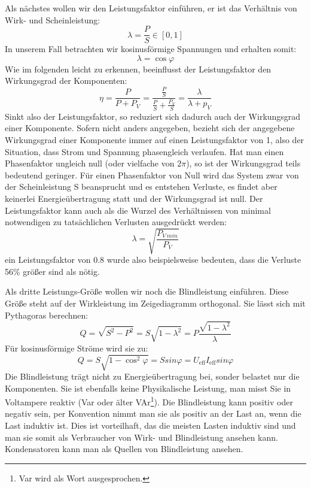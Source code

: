 Als nächstes wollen wir den Leistungsfaktor einführen, er ist das Verhältnis von Wirk- und Scheinleistung:
\begin{equation}
\lambda = \frac{P}{S} \in [0,1]
\end{equation}
In unserem Fall betrachten wir kosinusförmige Spannungen und erhalten somit:
\begin{equation}
\lambda = \cos \varphi
\end{equation}
Wie im folgenden leicht zu erkennen, beeinflusst der Leistungsfaktor den Wirkungsgrad der Komponenten:
\begin{equation}
\eta = \frac{P}{P+P_V} = \frac{\frac{P}{S}}{\frac{P}{S}+\frac{P_V}{S}} = \frac{\lambda}{\lambda + p_V}
\end{equation}
Sinkt also der Leistungsfaktor, so reduziert sich dadurch auch der Wirkungsgrad einer Komponente. Sofern nicht anders angegeben, bezieht sich der angegebene Wirkungsgrad einer Komponente immer auf einen Leistungsfaktor von 1, also der Situation, dass Strom und Spannung phasengleich verlaufen. Hat man einen Phasenfaktor ungleich null (oder vielfache von $2\pi$), so ist der Wirkungsgrad teils bedeutend geringer. Für einen Phasenfaktor von Null wird das System zwar von der Scheinleistung S beansprucht und es entstehen Verluste, es findet aber keinerlei Energieübertragung statt und der Wirkungsgrad ist null.
Der Leistungsfaktor kann auch als die Wurzel des Verhältnissen von minimal notwendigen zu tatsächlichen Verlusten ausgedrückt werden:
\begin{equation}
\lambda = \sqrt{\frac{P_{V\:min}}{P_V}}	%
\end{equation}
ein Leistungsfaktor von 0.8 wurde also beispielsweise bedeuten, dass die Verluste 56\% größer sind als nötig.

Als dritte Leistungs-Größe wollen wir noch die Blindleistung einführen. Diese Größe steht auf der Wirkleistung im Zeigediagramm orthogonal. %
Sie lässt sich mit Pythagoras berechnen:
\begin{equation}
Q = \sqrt{S^2-P^2} = S \sqrt{1-\lambda^2} = P \frac{\sqrt{1-\lambda^2}}{\lambda}
\end{equation}
Für kosinusförmige Ströme wird sie zu:
\begin{equation}
Q = S \sqrt{1-\cos^2 \varphi} = S sin \varphi = U_{\mathrm{eff}} I_{\mathrm{eff}} sin \varphi
\end{equation}
Die Blindleistung trägt nicht zu Energieübertragung bei, sonder belastet nur die Komponenten. Sie ist ebenfalls keine Physikalische Leistung, man misst Sie in Voltampere reaktiv (Var oder älter VAr\footnote{Var wird als Wort ausgesprochen.}).
Die Blindleistung kann positiv oder negativ sein, per Konvention nimmt man sie als positiv an der Last an, wenn die Last induktiv ist. Dies ist vorteilhaft, das die meisten Lasten induktiv sind und man sie somit als Verbraucher von Wirk- und Blindleistung ansehen kann. Kondensatoren kann man als Quellen von Blindleistung ansehen.\cite{Harrison}

